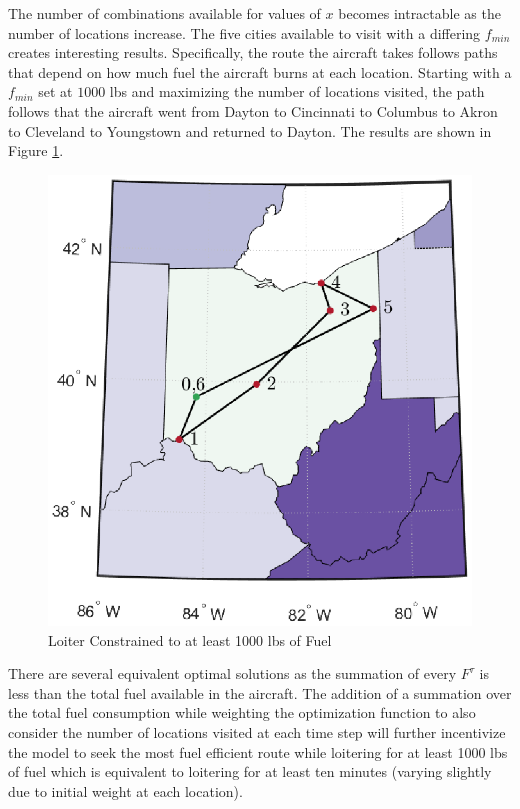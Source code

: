 The number of combinations available for values of $x$ becomes intractable as the number of locations increase. The five cities available to visit with a differing $f_{min}$ creates interesting results. Specifically, the route the aircraft takes follows paths that depend on how much fuel the aircraft burns at each location. Starting with a $f_{min}$ set at $1000$ lbs and maximizing the number of locations visited, the path follows that the aircraft went from Dayton to Cincinnati to Columbus to Akron to Cleveland to Youngstown and returned to Dayton. The results are shown in Figure \ref{fig:fmin1000}.
\begin{figure}[H]
    \centering
    \includegraphics{Thesis/Method_II/fmin1000.eps}
    \caption{Loiter Constrained to at least 1000 lbs of Fuel}
    \label{fig:fmin1000}
\end{figure}
There are several equivalent optimal solutions as the summation of every $F^\tau$ is less than the total fuel available in the aircraft. The addition of a summation over the total fuel consumption while weighting the optimization function to also consider the number of locations visited at each time step will further incentivize the model to seek the most fuel efficient route while loitering for at least 1000 lbs of fuel which is equivalent to loitering for at least ten minutes (varying slightly due to initial weight at each location).\par
